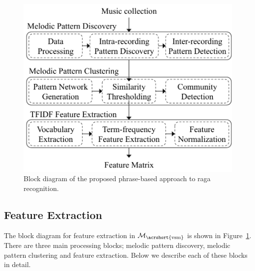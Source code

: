 \begin{figure}
	\begin{center}
		\includegraphics[width=\figSizeSeventy]{ch07_ragaRecognition/figures/bd_phasebased_raga_recognition.pdf}
	\end{center}
	\caption{Block diagram of the proposed phrase-based approach to \gls{raga} recognition.}
	\label{fig:bd_phasebased_raga_recognition}
\end{figure}






\subsection{Feature Extraction}
\label{sec:vsm_feature_extraction}

The block diagram for feature extraction in $\mathcal{M}_\mathrm{\acrshort{vsm}}$ is shown in Figure~\ref{fig:bd_phasebased_raga_recognition}. There are three main processing blocks; melodic pattern discovery, melodic pattern clustering and feature extraction. Below we describe each of these blocks in detail. 

